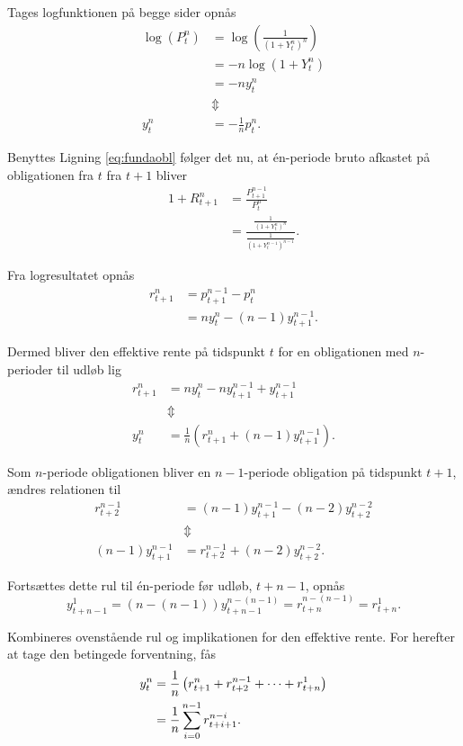 \documentclass[
  a4paper,
  oneside]{memoir}
\begin{document}
Tages logfunktionen på begge sider opnås
\begin{align*}
\log\left(P_t^n\right)&=\log\left(\frac{1}{\left(1+Y_t^n\right)^n}\right)\\
&=-n\log\left(1+Y_t^n\right)\\
&=-n y_t^n\\
&\Updownarrow\\
y_t^n&=-\frac{1}{n}p_t^n.
\end{align*}

Benyttes Ligning \eqref{eq:fundaobl} følger det nu, at én-periode bruto afkastet på obligationen fra \(t\) fra \(t+1\) bliver
\begin{align*}
1+R_{t+1}^n&=\frac{P_{t+1}^{n-1}}{P_t^n}\\
&=\frac{\frac{1}{\left(1+Y_t^n\right)^n}}{\frac{1}{\left(1+Y_t^{n-1}\right)^{n-1}}}.
\end{align*}

Fra logresultatet opnås
\begin{align*}
r_{t+1}^n&=p_{t+1}^{n-1}-p_t^n\\
&=n y_t^n - \left(n-1\right) y_{t+1}^{n-1}.
\end{align*}

Dermed bliver den effektive rente på tidspunkt \(t\) for en obligationen med \(n\)-perioder til udløb lig
\begin{align*}
r_{t+1}^n&=n y_t^n - ny_{t+1}^{n-1}+y_{t+1}^{n-1}\\
&\Updownarrow\\
y_t^n &=\frac{1}{n}\left( r_{t+1}^n + (n-1) y_{t+1}^{n-1} \right).
\end{align*}

Som \(n\)-periode obligationen bliver en \(n-1\)-periode obligation på tidspunkt \(t+1\), ændres relationen til
\begin{align*}
r_{t+2}^{n-1}&=\left(n-1\right) y_{t+1}^{n-1} - \left(n-2\right) y_{t+2}^{n-2}\\
&\Updownarrow\\
\left(n-1\right) y_{t+1}^{n-1}&=r_{t+2}^{n-1} + \left(n-2\right) y_{t+2}^{n-2}.
\end{align*}

Fortsættes dette rul til én-periode før udløb, \(t+n-1\), opnås
\begin{equation*}
y_{t+n-1}^{1}=\left(n-\left(n-1\right)\right)y_{t+n-1}^{n-\left(n-1\right)}=r_{t+n}^{n-\left(n-1\right)}=r_{t+n}^1.
\end{equation*}

Kombineres ovenstående rul og implikationen for den effektive rente. For herefter at tage den betingede forventning, fås
\begin{align}
y_t^n&=\frac{1}{n} \left(r_{t+1}^n + r_{t+2}^{n-1}+\cdots+r_{t+n}^1\right)\notag\\
&=\frac{1}{n}\sum_{i=0}^{n-1} r_{t+i+1}^{n-i}. \label{eq:ytn}
\end{align}
\end{document}
